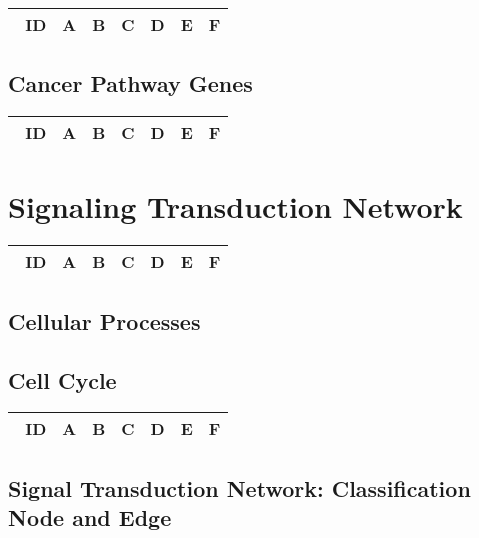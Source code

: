 \documentclass[preprint, 8pt]{elsarticle}
\theoremstyle{definition}
\begin{document}
\begin{table}[H]\centering
\begin{tabular}{p{1cm}p{1cm}p{1cm}p{1cm}p{1cm}p{1cm}p{4cm}}\
ID & A & B & C & D & E & F \\
\hline
\hline
\end{tabular}
\end{table}

\subsection{Cancer Pathway Genes}

\begin{table}[H]\centering
\begin{tabular}{p{1cm}p{1cm}p{1cm}p{1cm}p{1cm}p{1cm}p{4cm}}\
ID & A & B & C & D & E & F \\
\hline
\hline
\end{tabular}
\end{table}

\section{Signaling Transduction Network}

\begin{table}[H]\centering
\begin{tabular}{p{1cm}p{1cm}p{1cm}p{1cm}p{1cm}p{1cm}p{4cm}}\
ID & A & B & C & D & E & F \\
\hline
\hline
\end{tabular}
\end{table}

\subsection{Cellular Processes}

\subsection{Cell Cycle}

\begin{table}[H]\centering
\begin{tabular}{p{1cm}p{1cm}p{1cm}p{1cm}p{1cm}p{1cm}p{4cm}}\
ID & A & B & C & D & E & F \\
\hline
\hline
\end{tabular}
\end{table}

\subsection{Signal Transduction Network: Classification Node and Edge}
\end{document}
